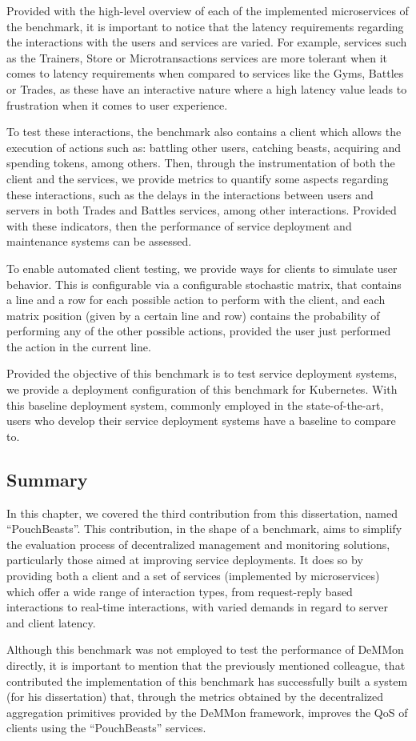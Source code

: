 Provided with the high-level overview of each of the implemented microservices of the benchmark, it is important to notice that the latency requirements regarding the interactions with the users and services are varied. For example, services such as the Trainers, Store or Microtransactions services are more tolerant when it comes to latency requirements when compared to services like the Gyms, Battles or Trades, as these have an interactive nature where a high latency value leads to frustration when it comes to user experience.

To test these interactions, the benchmark also contains a client which allows the execution of actions such as: battling other users, catching beasts, acquiring and spending tokens, among others. Then, through the instrumentation of both the client and the services, we provide metrics to quantify some aspects regarding these interactions, such as the delays in the interactions between users and servers in both Trades and Battles services, among other interactions. Provided with these indicators, then the performance of service deployment and maintenance systems can be assessed.

To enable automated client testing, we provide ways for clients to simulate user behavior. This is configurable via a configurable stochastic matrix, that contains a line and a row for each possible action to perform with the client, and each matrix position (given by a certain line and row) contains the probability of performing any of the other possible actions, provided the user just performed the action in the current line. 

Provided the objective of this benchmark is to test service deployment systems, we provide a deployment configuration of this benchmark for Kubernetes. With this baseline deployment system, commonly employed in the state-of-the-art, users who develop their service deployment systems have a baseline to compare to.

\subsection{Summary}

In this chapter, we covered the third contribution from this dissertation, named ``PouchBeasts''. This contribution, in the shape of a benchmark, aims to simplify the evaluation process of decentralized management and monitoring solutions, particularly those aimed at improving service deployments. It does so by providing both a client and a set of services (implemented by microservices) which offer a wide range of interaction types, from request-reply based interactions to real-time interactions, with varied demands in regard to server and client latency.

Although this benchmark was not employed to test the performance of DeMMon directly, it is important to mention that the previously mentioned colleague, that contributed the implementation of this benchmark has successfully built a system (for his dissertation) that, through the metrics obtained by the decentralized aggregation primitives provided by the DeMMon framework, improves the QoS of clients using the ``PouchBeasts'' services.